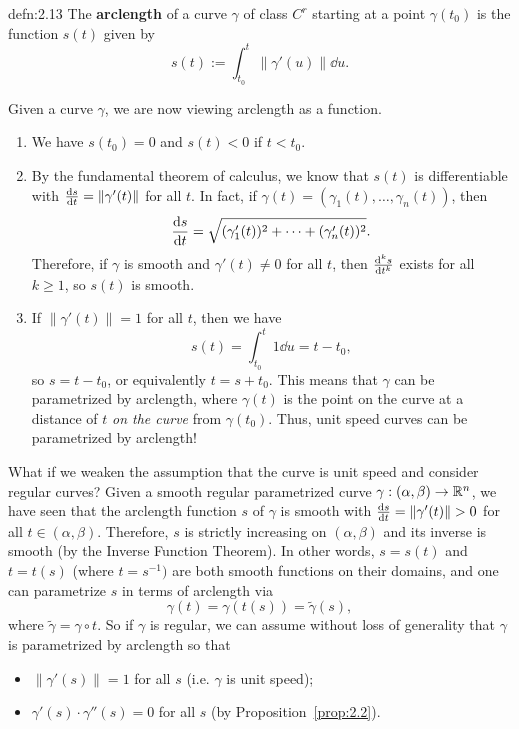 \begin{defn}{defn:2.13}
    The {\bf arclength} of a curve $\gamma$ of class $C^r$ starting 
    at a point $\gamma(t_0)$ is the function $s(t)$ given by 
    \[ s(t) := \int_{t_0}^t \|\gamma'(u)\|\dd u. \] 
\end{defn}\vspace{-0.25cm}

Given a curve $\gamma$, we are now viewing arclength as a function.
\begin{enumerate}[(1)]
    \item We have $s(t_0) = 0$ and $s(t) < 0$ if $t < t_0$. 
    \item By the fundamental theorem of calculus, we know that $s(t)$ is 
    differentiable with $\frac{{\rm d}s}{{\rm d}t} = \|\gamma'(t)\|$ for all 
    $t$. In fact, if $\gamma(t) = (\gamma_1(t), \dots, \gamma_n(t))$, then 
    \[ \frac{{\rm d}s}{{\rm d}t} = \sqrt{(\gamma'_1(t))^2 + \cdots + 
    (\gamma'_n(t))^2}. \] 
    Therefore, if $\gamma$ is smooth and $\gamma'(t) \neq 0$ for all $t$, 
    then $\frac{{\rm d}^k s}{{\rm d}t^k}$ exists for all $k \geq 1$, 
    so $s(t)$ is smooth.
    \item If $\|\gamma'(t)\| = 1$ for all $t$, then we have 
    \[ s(t) = \int_{t_0}^t 1\dd u = t - t_0, \] 
    so $s = t - t_0$, or equivalently $t = s + t_0$. This means that 
    $\gamma$ can be parametrized by arclength, where $\gamma(t)$ 
    is the point on the curve at a distance of $t$ \emph{on the curve} 
    from $\gamma(t_0)$. Thus, unit speed curves can be parametrized by 
    arclength!
\end{enumerate}

What if we weaken the assumption that the curve is unit speed 
and consider regular curves?
Given a smooth regular parametrized curve $\gamma : (\alpha, \beta) \to \mathbb{R}^n$, 
we have seen that the arclength function $s$ of $\gamma$ is smooth with 
$\frac{{\rm d}s}{{\rm d}t} = \|\gamma'(t)\| > 0$ for all $t \in (\alpha, \beta)$.
Therefore, $s$ is strictly increasing on $(\alpha, \beta)$ and its inverse 
is smooth (by the Inverse Function Theorem). In other words, 
$s = s(t)$ and $t = t(s)$ (where $t = s^{-1})$ are both smooth functions 
on their domains, and one can parametrize $s$ in terms of arclength via 
\[ \gamma(t) = \gamma(t(s)) = \tilde\gamma(s), \] 
where $\tilde\gamma = \gamma \circ t$. So if $\gamma$ is regular, we can 
assume without loss of generality that $\gamma$ is parametrized by arclength 
so that 
\begin{itemize}
    \item $\|\gamma'(s)\| = 1$ for all $s$ (i.e. $\gamma$ is unit speed);
    \item $\gamma'(s) \cdot \gamma''(s) = 0$ for all $s$ (by Proposition~\ref{prop:2.2}).
\end{itemize}

